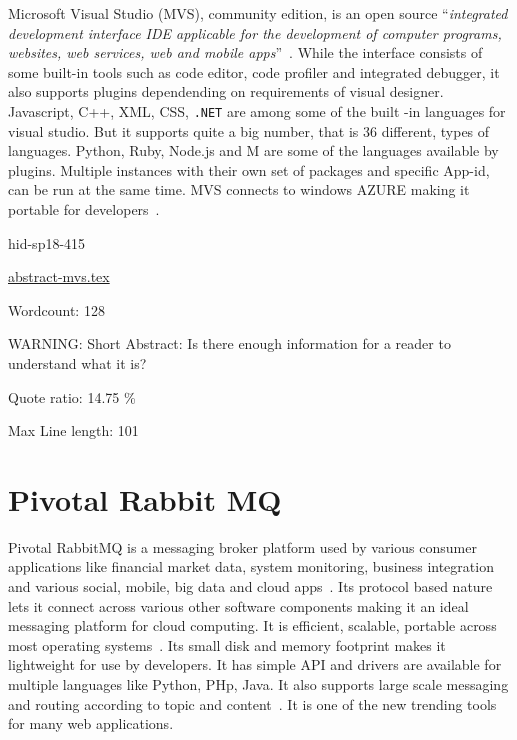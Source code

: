 Microsoft Visual Studio (MVS), community edition, is an open source \color{blue}``\emph{integrated
development interface IDE applicable for the development of computer programs, 
websites, web services, web and mobile apps}''\color{black}~\cite{hid-sp18-415-wikipedia-org}. While 
the interface consists of some built-in tools such as code editor, code profiler
and integrated debugger, it also supports plugins dependending on  requirements 
of visual designer. Javascript, C++, XML, CSS, \verb|.NET| are among some of the 
built -in languages for visual studio. But it supports quite a big number, 
that is 36 different, types of languages. Python, Ruby, Node.js and M are 
some of the languages available by plugins.  Multiple instances with their own
set of packages and specific App-id, can be run at the same time. MVS 
connects to windows AZURE making it portable for
developers~\cite{hid-sp18-415-wikipedia-org}.



\begin{IU}

hid-sp18-415

\href{https://github.com/cloudmesh-community/hid-sp18-415/blob/master//technology/abstract-mvs.tex}{abstract-mvs.tex}

 

Wordcount: 128

WARNING: Short Abstract: Is there enough information for a reader to understand what it is?


Quote ratio: 14.75 \%
 
Max Line length: 101
\end{IU}

\section{Pivotal Rabbit MQ}

Pivotal RabbitMQ is a messaging broker platform used by various consumer 
applications like financial market data, system monitoring, business 
integration and various social, mobile, big data and cloud 
apps~\cite{hid-sp18-415-www-pivotal}. Its protocol based nature lets 
it connect across various other software components making it an ideal 
messaging platform for cloud computing. It is efficient, scalable, 
portable across most operating systems~\cite{hid-sp18-415-www-pivotal}. Its 
small disk and memory footprint makes it lightweight for use by 
developers. It has simple API and drivers are available for multiple 
languages like Python, PHp, Java. It also supports large scale 
messaging and routing according to topic and 
content~\cite{hid-sp18-415-www-pivotal}. It is one of the new trending 
tools for many web applications.


